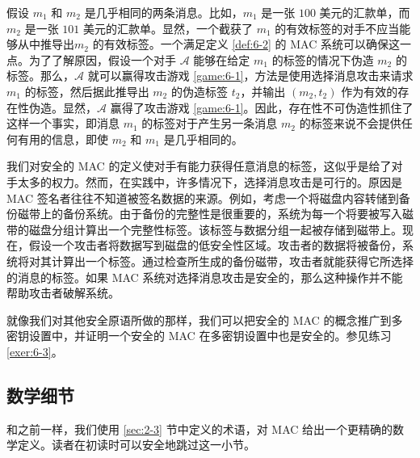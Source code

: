 \begin{example}\label{exmp:6-3}
假设 $m_1$ 和 $m_2$ 是几乎相同的两条消息。比如，$m_1$ 是一张 $100$ 美元的汇款单，而 $m_2$ 是一张 $101$ 美元的汇款单。显然，一个截获了 $m_1$ 的有效标签的对手不应当能够从中推导出$m_2$ 的有效标签。一个满足定义 \ref{def:6-2} 的 MAC 系统可以确保这一点。为了了解原因，假设一个对手 $\mathcal{A}$ 能够在给定 $m_1$ 的标签的情况下伪造 $m_2$ 的标签。那么，$\mathcal{A}$ 就可以赢得攻击游戏 \ref{game:6-1}，方法是使用选择消息攻击来请求 $m_1$ 的标签，然后据此推导出 $m_2$ 的伪造标签 $t_2$，并输出 $(m_2,t_2)$ 作为有效的存在性伪造。显然，$\mathcal{A}$ 赢得了攻击游戏 \ref{game:6-1}。因此，存在性不可伪造性抓住了这样一个事实，即消息 $m_1$ 的标签对于产生另一条消息 $m_2$ 的标签来说不会提供任何有用的信息，即使 $m_2$ 和 $m_1$ 是几乎相同的。
\end{example}

\begin{example}\label{exmp:6-4}
我们对安全的 MAC 的定义使对手有能力获得任意消息的标签，这似乎是给了对手太多的权力。然而，在实践中，许多情况下，选择消息攻击是可行的。原因是 MAC 签名者往往不知道被签名数据的来源。例如，考虑一个将磁盘内容转储到备份磁带上的备份系统。由于备份的完整性是很重要的，系统为每一个将要被写入磁带的磁盘分组计算出一个完整性标签。该标签与数据分组一起被存储到磁带上。现在，假设一个攻击者将数据写到磁盘的低安全性区域。攻击者的数据将被备份，系统将对其计算出一个标签。通过检查所生成的备份磁带，攻击者就能获得它所选择的消息的标签。如果 MAC 系统对选择消息攻击是安全的，那么这种操作并不能帮助攻击者破解系统。
\end{example}

\begin{remark}\label{remark:6-1}
就像我们对其他安全原语所做的那样，我们可以把安全的 MAC 的概念推广到多密钥设置中，并证明一个安全的 MAC 在多密钥设置中也是安全的。参见练习 \ref{exer:6-3}。
\end{remark}

\subsection{数学细节}\label{subsec:6-1-1}

和之前一样，我们使用 \ref{sec:2-3} 节中定义的术语，对 MAC 给出一个更精确的数学定义。读者在初读时可以安全地跳过这一小节。

